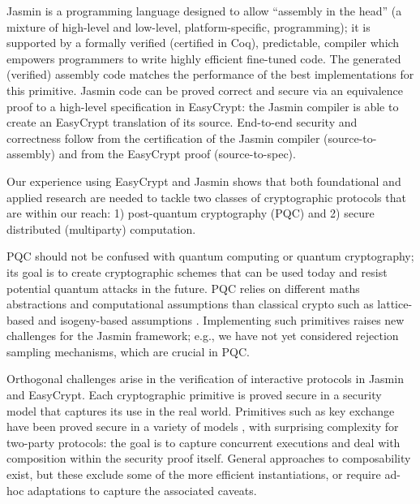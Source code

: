 \documentclass[preprint]{iacrtrans}
\begin{document}
    \hspace{4mm} Jasmin \cite{JASM} is a programming language designed to allow “assembly in the head” (a mixture of high-level and low-level, platform-specific, programming); it is supported by a formally verified (certified in Coq), predictable, compiler which empowers programmers to write highly efficient fine-tuned code. The generated (verified) assembly code matches the performance of the best implementations for this primitive. Jasmin code can be proved correct and secure via an equivalence proof to a high-level specification in EasyCrypt: the Jasmin compiler is able to create an EasyCrypt translation of its source. End-to-end security and correctness follow from the certification of the Jasmin compiler (source-to-assembly) and from the EasyCrypt proof (source-to-spec).  

    \par Our experience using EasyCrypt and Jasmin \cite{SoK} shows that both foundational and applied research are needed to tackle two classes of cryptographic protocols that are within our reach: 1) post-quantum cryptography (PQC) and 2) secure distributed (multiparty) computation. 

    \par PQC should not be confused with quantum computing or quantum cryptography; its goal is to create cryptographic schemes that can be used today and resist potential quantum attacks in the future. PQC relies on different maths abstractions and computational assumptions than classical crypto such as lattice-based \cite{CRYS} and isogeny-based assumptions \cite{SIKE}. Implementing such primitives raises new challenges for the Jasmin framework; e.g., we have not yet considered rejection sampling mechanisms, which are crucial in PQC.  

    \par Orthogonal challenges arise in the verification of interactive protocols in Jasmin and EasyCrypt. Each cryptographic primitive is proved secure in a security model that captures its use in the real world. Primitives such as key exchange have been proved secure in a variety of models \cite{KECR}, with surprising complexity for two-party protocols: the goal is to capture concurrent executions and deal with composition within the security proof itself. General approaches to composability \cite{UC} exist, but these exclude some of the more efficient instantiations, or require ad-hoc adaptations to capture the associated caveats.
\end{document}
